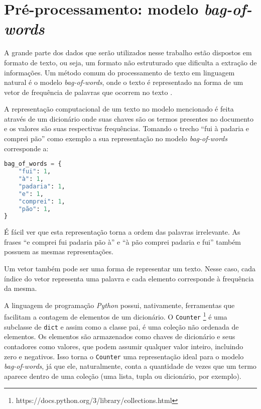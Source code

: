 \section{Pré-processamento: modelo \textit{bag-of-words}}
\label{sec:modelo_te}

A grande parte dos dados que serão utilizados nesse trabalho estão dispostos em formato de texto, ou seja, um formato não estruturado que dificulta a extração de informações. Um método comum do processamento de texto em linguagem natural é o modelo \textit{bag-of-words}, onde o texto é representado na forma de um vetor de frequência de palavras que ocorrem no texto \cite{pretext}.

A representação computacional de um texto no modelo mencionado é feita através de um dicionário onde suas chaves são os termos presentes no documento e os valores são suas respectivas frequências. Tomando o trecho ``fui à padaria e comprei pão'' como exemplo a sua representação no modelo \textit{bag-of-words} corresponde a:

\begin{lstlisting}[language=Python, caption=Representação de um trecho  no modelo bag-of-words]
bag_of_words = {
    "fui": 1,
    "à": 1,
    "padaria": 1,
    "e": 1,
    "comprei": 1,
    "pão": 1,
}
\end{lstlisting}

É fácil ver que esta representação torna a ordem das palavras irrelevante. As frases ``e comprei fui padaria pão à'' e ``à pão comprei padaria e fui'' também possuem as mesmas representações.

Um vetor também pode ser uma forma de representar um texto. Nesse caso, cada índice do vetor representa uma palavra e cada elemento corresponde à frequência da mesma.

A linguagem de programação \textit{Python} possui, nativamente, ferramentas que facilitam a contagem de elementos de um dicionário. O \texttt{Counter} \footnote{https://docs.python.org/3/library/collections.html} é uma subclasse de \texttt{dict} e assim como a classe pai, é uma coleção não ordenada de elementos. Os elementos são armazenados como chaves de dicionário e seus contadores como valores, que podem assumir qualquer valor inteiro, incluindo zero e negativos. Isso torna o \texttt{Counter} uma representação ideal para o modelo \textit{bag-of-words}, já que ele, naturalmente, conta a quantidade de vezes que um termo aparece dentro de uma coleção (uma lista, tupla ou dicionário, por exemplo).




